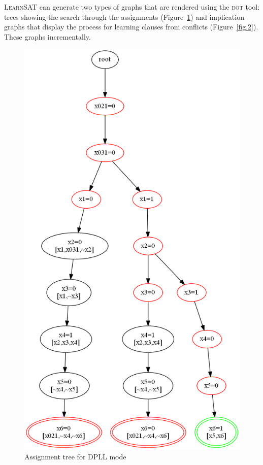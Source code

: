 \documentclass[11pt]{article}
\newcommand*{\ls}{\textsc{LearnSAT}}
\begin{document}
\ls{} can generate two types of graphs that are rendered using the \textsc{dot} tool: trees showing the search through the assignments  (Figure~\ref{fig.1}) and implication graphs that display the process for learning clauses from conflicts  (Figure~\ref{fig.2}). These graphs incrementally.

\begin{figure}
\vspace*{-2ex}
\begin{center}
\includegraphics[keepaspectratio=true,height=.6\textheight]{tree1-color}
\caption{Assignment tree for DPLL mode}\label{fig.1}
\end{center}
\end{figure}
 
\end{document}
